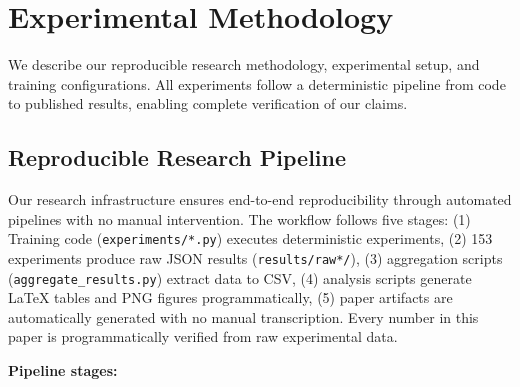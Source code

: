 
\section{Experimental Methodology}
\label{sec:methods}

We describe our reproducible research methodology, experimental setup, and training configurations. All experiments follow a deterministic pipeline from code to published results, enabling complete verification of our claims.

\subsection{Reproducible Research Pipeline}
\label{sec:methods:pipeline}

Our research infrastructure ensures end-to-end reproducibility through automated pipelines with no manual intervention. The workflow follows five stages: (1) Training code (\texttt{experiments/*.py}) executes deterministic experiments, (2) 153 experiments produce raw JSON results (\texttt{results/raw*/}), (3) aggregation scripts (\texttt{aggregate\_results.py}) extract data to CSV, (4) analysis scripts generate LaTeX tables and PNG figures programmatically, (5) paper artifacts are automatically generated with no manual transcription. Every number in this paper is programmatically verified from raw experimental data.

\textbf{Pipeline stages:}

